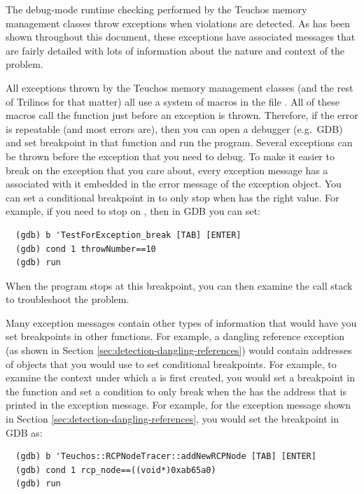 \documentclass[pdf,ps2pdf,11pt]{SANDreport}
\begin{document}
The debug-mode runtime checking performed by the Teuchos memory
management classes throw exceptions when violations are detected.  As
has been shown throughout this document, these exceptions have
associated messages that are fairly detailed with lots of information
about the nature and context of the problem.

All exceptions thrown by the Teuchos memory management classes (and
the rest of Trilinos for that matter) all use a system of macros in
the file {}.  All of these
macros call the function {} just
before an exception is thrown.  Therefore, if the error is repeatable
(and most errors are), then you can open a debugger (e.g.\ GDB) and
set breakpoint in that function and run the program.  Several
exceptions can be thrown before the exception that you need to debug.
To make it easier to break on the exception that you care about, every
exception message has a {} associated with it
embedded in the error message of the exception object.  You can set a
conditional breakpoint in {} to
only stop when {} has the right value.  For
example, if you need to stop on {}, then in
GDB you can set:

{\small\begin{verbatim}
  (gdb) b 'TestForException_break [TAB] [ENTER]
  (gdb) cond 1 throwNumber==10
  (gdb) run
\end{verbatim}}

When the program stops at this breakpoint, you can then examine the
call stack to troubleshoot the problem.

Many exception messages contain other types of information that would
have you set breakpoints in other functions.  For example, a dangling
reference exception (as shown in Section
{}\ref{sec:detection-dangling-references}) would contain addresses of
objects that you would use to set conditional breakpoints.  For
example, to examine the context under which a {} is
first created, you would set a breakpoint in the function
{} and set a
condition to only break when the {} has the address
that is printed in the exception message.  For example, for the
exception message shown in Section
{}\ref{sec:detection-dangling-references}, you would set the
breakpoint in GDB as:

{\small\begin{verbatim}
  (gdb) b 'Teuchos::RCPNodeTracer::addNewRCPNode [TAB] [ENTER]
  (gdb) cond 1 rcp_node==((void*)0xab65a0)
  (gdb) run
\end{verbatim}}
\end{document}

